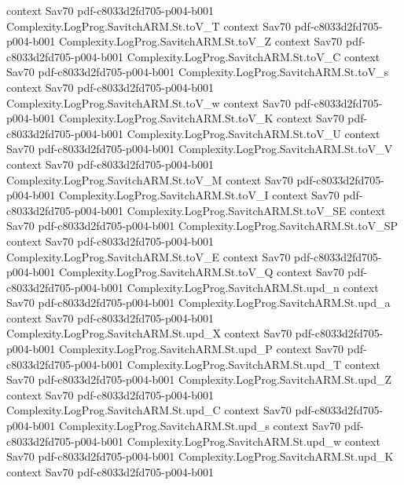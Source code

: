 \begin{theorem}
  {context}
  {Sav70}
  {pdf-c8033d2fd705-p004-b001}
\proofstep
  {Complexity.LogProg.SavitchARM.St.toV_T}
  {context}
  {Sav70}
  {pdf-c8033d2fd705-p004-b001}
\proofstep
  {Complexity.LogProg.SavitchARM.St.toV_Z}
  {context}
  {Sav70}
  {pdf-c8033d2fd705-p004-b001}
\proofstep
  {Complexity.LogProg.SavitchARM.St.toV_C}
  {context}
  {Sav70}
  {pdf-c8033d2fd705-p004-b001}
\proofstep
  {Complexity.LogProg.SavitchARM.St.toV_s}
  {context}
  {Sav70}
  {pdf-c8033d2fd705-p004-b001}
\proofstep
  {Complexity.LogProg.SavitchARM.St.toV_w}
  {context}
  {Sav70}
  {pdf-c8033d2fd705-p004-b001}
\proofstep
  {Complexity.LogProg.SavitchARM.St.toV_K}
  {context}
  {Sav70}
  {pdf-c8033d2fd705-p004-b001}
\proofstep
  {Complexity.LogProg.SavitchARM.St.toV_U}
  {context}
  {Sav70}
  {pdf-c8033d2fd705-p004-b001}
\proofstep
  {Complexity.LogProg.SavitchARM.St.toV_V}
  {context}
  {Sav70}
  {pdf-c8033d2fd705-p004-b001}
\proofstep
  {Complexity.LogProg.SavitchARM.St.toV_M}
  {context}
  {Sav70}
  {pdf-c8033d2fd705-p004-b001}
\proofstep
  {Complexity.LogProg.SavitchARM.St.toV_I}
  {context}
  {Sav70}
  {pdf-c8033d2fd705-p004-b001}
\proofstep
  {Complexity.LogProg.SavitchARM.St.toV_SE}
  {context}
  {Sav70}
  {pdf-c8033d2fd705-p004-b001}
\proofstep
  {Complexity.LogProg.SavitchARM.St.toV_SP}
  {context}
  {Sav70}
  {pdf-c8033d2fd705-p004-b001}
\proofstep
  {Complexity.LogProg.SavitchARM.St.toV_E}
  {context}
  {Sav70}
  {pdf-c8033d2fd705-p004-b001}
\proofstep
  {Complexity.LogProg.SavitchARM.St.toV_Q}
  {context}
  {Sav70}
  {pdf-c8033d2fd705-p004-b001}
\proofstep
  {Complexity.LogProg.SavitchARM.St.upd_n}
  {context}
  {Sav70}
  {pdf-c8033d2fd705-p004-b001}
\proofstep
  {Complexity.LogProg.SavitchARM.St.upd_a}
  {context}
  {Sav70}
  {pdf-c8033d2fd705-p004-b001}
\proofstep
  {Complexity.LogProg.SavitchARM.St.upd_X}
  {context}
  {Sav70}
  {pdf-c8033d2fd705-p004-b001}
\proofstep
  {Complexity.LogProg.SavitchARM.St.upd_P}
  {context}
  {Sav70}
  {pdf-c8033d2fd705-p004-b001}
\proofstep
  {Complexity.LogProg.SavitchARM.St.upd_T}
  {context}
  {Sav70}
  {pdf-c8033d2fd705-p004-b001}
\proofstep
  {Complexity.LogProg.SavitchARM.St.upd_Z}
  {context}
  {Sav70}
  {pdf-c8033d2fd705-p004-b001}
\proofstep
  {Complexity.LogProg.SavitchARM.St.upd_C}
  {context}
  {Sav70}
  {pdf-c8033d2fd705-p004-b001}
\proofstep
  {Complexity.LogProg.SavitchARM.St.upd_s}
  {context}
  {Sav70}
  {pdf-c8033d2fd705-p004-b001}
\proofstep
  {Complexity.LogProg.SavitchARM.St.upd_w}
  {context}
  {Sav70}
  {pdf-c8033d2fd705-p004-b001}
\proofstep
  {Complexity.LogProg.SavitchARM.St.upd_K}
  {context}
  {Sav70}
  {pdf-c8033d2fd705-p004-b001}

\end{theorem}
